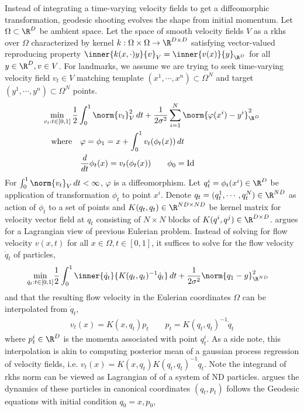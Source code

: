 \documentclass[11pt]{article}
\begin{document}
Instead of integrating a time-varying velocity fields to get a diffeomorphic transformation, geodesic shooting evolves the shape from initial momentum. Let $\Omega \subset\R^D$ be ambient space. Let the space of smooth velocity fields $V$ as a rkhs over $\Omega$ characterized by kernel $k:\Omega\times\Omega\to\R^{D\times D}$ satisfying vector-valued reproducing property $\inner{k(x,\cdot)y}{v}_{V} = \inner{v(x)}{y}_{\R^D}$ for all $y\in\R^D, v\in V$. For landmarks, we assume we are trying to seek time-varying velocity field $v_t\in V$ matching template $(x^1,\cdots,x^n)\subset \Omega^N$ and target $(y^1,\cdots,y^n)\subset\Omega^N$ points.
\begin{align}
    \min_{v_t:t\in [0,1]} \,
        &\frac{1}{2} \int_0^1 \norm{v_t}_V^2 \, dt + \frac{1}{2\sigma^2} \sum_{i=1}^N \norm{\varphi(x^i) - y^i}_{\R^{D}}^2 \\
        \text{where}
            &\quad \varphi = \phi_1 = x + \int_0^1 v_t(\phi_t(x)) \, dt \\
            &\quad \frac{d}{dt}\phi_t(x) = v_t(\phi_t(x)) \quad\quad \phi_0 = \text{Id}
\end{align}
For $\int_0^1 \norm{v_t}_V \, dt < \infty$, $\varphi$ is a diffeomorphism. Let $q_t^i = \phi_t(x^i) \in \R^D$ be application of transformation $\phi_t$ to point $x^i$. Denote $q_t = (q_t^1, \cdots, q_t^N) \in \R^{ND}$ as action of $\phi_t$ to a set of points and $K(q_t,q_t) \in \R^{ND\times ND}$ be kernel matrix for velocity vector field at $q_t$ consisting of $N\times N$ blocks of $K(q^i,q^j) \in \R^{D\times D}$. \cite{joshiLandmarkMatchingLarge2000} argues for a Lagrangian view of previous Eulerian problem. Instead of solving for flow velocity $v(x,t)$ for all $x\in\Omega, t\in [0,1]$, it suffices to solve for the flow velocity $\dot{q}_t$ of particles,
\begin{align}
    \min_{\dot{q}_t:t\in [0,1]}
        &\frac{1}{2} \int_0^1 \inner{\dot{q}_t}{K(q_t,q_t)^{-1}\dot{q}_t} \, dt + \frac{1}{2\sigma^2} \norm{q_1 - y}_{\R^{ND}}^2
\end{align}
and that the resulting flow velocity in the Eulerian coordinates $\Omega$ can be interpolated from $\dot{q}_t$,
\begin{align}
    v_t(x)
        = K(x, q_t) p_t
    \quad\quad
    p_t
        = K(q_t, q_t)^{-1} \dot{q}_t
\end{align}
where $p_t^i \in \R^{D}$ is the momenta associated with point $q_t^i$. As a side note, this interpolation is akin to computing posterior mean of a gaussian process regression of velocity fields, i.e. $v_t(x) = K(x,q_t) K(q_t,q_t)^{-1} \dot{q}_t$. Note the integrand of rkhs norm can be viewed as Lagrangian of of a system of ND particles. \cite{millerGeodesicShootingComputational2006} argues the dynamics of these particles in canonical coordinates $(q_t,p_t)$ follows the Geodesic equations with initial condition $q_0 = x, p_0$,
\end{document}
